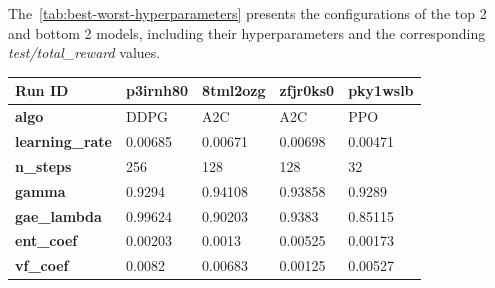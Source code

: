 \documentclass[../xlapes02]{subfiles}
\begin{document}
    The~\cref{tab:best-worst-hyperparameters} presents the configurations of the top 2 and bottom 2 models, including their hyperparameters and the corresponding \emph{test/total\_reward} values.

    \begin{table}[H]
        \centering
        {\footnotesize
            \begin{tabular}{|l||l|l||l|l|}
                \hline
                \textbf{Run ID}                    & p3irnh80                                     & 8tml2ozg                                     & zfjr0ks0                                     & pky1wslb                                     \\ \hline
                \textbf{algo}                      & DDPG                                         & A2C                                          & A2C                                          & PPO                                          \\ \hline
                \textbf{learning\_rate}            & 0.00685                                      & 0.00671                                      & 0.00698                                      & 0.00471                                      \\ \hline
                \textbf{n\_steps}                  & 256                                          & 128                                          & 128                                          & 32                                           \\ \hline
                \textbf{gamma}                     & 0.9294                                       & 0.94108                                      & 0.93858                                      & 0.9289                                       \\ \hline
                \textbf{gae\_lambda}               & 0.99624                                      & 0.90203                                      & 0.9383                                       & 0.85115                                      \\ \hline
                \textbf{ent\_coef}                 & 0.00203                                      & 0.0013                                       & 0.00525                                      & 0.00173                                      \\ \hline
                \textbf{vf\_coef}                  & 0.0082                                       & 0.00683                                      & 0.00125                                      & 0.00527                                      \\ \hline

\end{tabular}}
\end{table}
\end{document}
